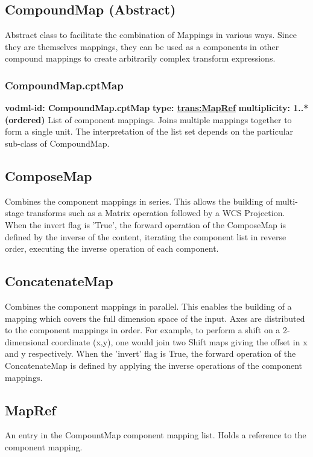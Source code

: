   \subsection{CompoundMap (Abstract)}
  \label{sect:CompoundMap}
    Abstract class to facilitate the combination of Mappings in various ways. Since they are themselves mappings, they can be used as a components in other compound mappings to create arbitrarily complex transform expressions.

    \subsubsection{CompoundMap.cptMap}
      \textbf{vodml-id: CompoundMap.cptMap} \newline
      \textbf{type: \hyperref[sect:MapRef]{trans:MapRef}} \newline
      \textbf{multiplicity: 1..*  (ordered)} \newline 
      List of component mappings. Joins multiple mappings together to form a single unit. The interpretation of the list set depends on the particular sub-class of CompoundMap.

  \subsection{ComposeMap}
  \label{sect:ComposeMap}
    Combines the component mappings in series. This allows the building of multi-stage transforms such as a Matrix operation followed by a WCS Projection. When the invert flag is 'True', the forward operation of the ComposeMap is defined by the inverse of the content, iterating the component list in reverse order, executing the inverse operation of each component.

  \subsection{ConcatenateMap}
  \label{sect:ConcatenateMap}
    Combines the component mappings in parallel. This enables the building of a mapping which covers the full dimension space of the input. Axes are distributed to the component mappings in order. For example, to perform a shift on a 2-dimensional coordinate (x,y), one would join two Shift maps giving the offset in x and y respectively. When the 'invert' flag is True, the forward operation of the ConcatenateMap is defined by applying the inverse operations of the component mappings.

  \subsection{MapRef}
  \label{sect:MapRef}
    An entry in the CompountMap component mapping list. Holds a reference to the component mapping.

